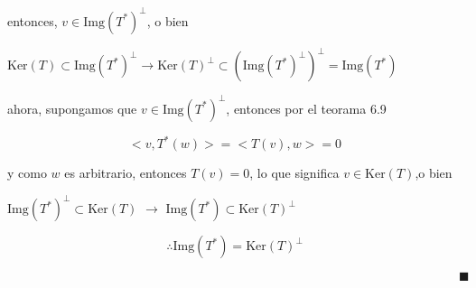 \documentclass[12pt,a4paper]{article}
\begin{document}
\begin{enumerate}
\begin{enumerate}
        entonces, $v \in \text{Img}(T^{*})^{\bot}$, o bien 
        
        $\text{Ker}(T) \subset \text{Img}(T^{*})^{\bot} \rightarrow \text{Ker}(T)^{\bot} \subset (\text{Img}(T^{*})^{\bot})^{\bot}= \text{Img}(T^{*})$
        

        
        ahora, supongamos que $v \in \text{Img}(T^{*})^{\bot}$, entonces por el teorama 6.9
        
        \begin{equation*}
            <v,T^{*}(w)> = <T(v), w> = 0
        \end{equation*}
        
        y como $w$ es arbitrario, entonces $T(v)= 0$, lo que significa $v \in \text{Ker}(T)$,o bien
        
        $\text{Img}(T^{*})^{\bot} \subset \text{Ker}(T)$ $\rightarrow$ $\text{Img}(T^{*}) \subset \text{Ker}(T)^{\bot}$
        
        \begin{equation*}
            \therefore  \text{Img} (T^{*}) = \text{Ker}(T)^{\bot}
        \end{equation*}
        
        $\hspace{15cm} \blacksquare$
        
    \end{enumerate}
\end{enumerate}
\end{document}
